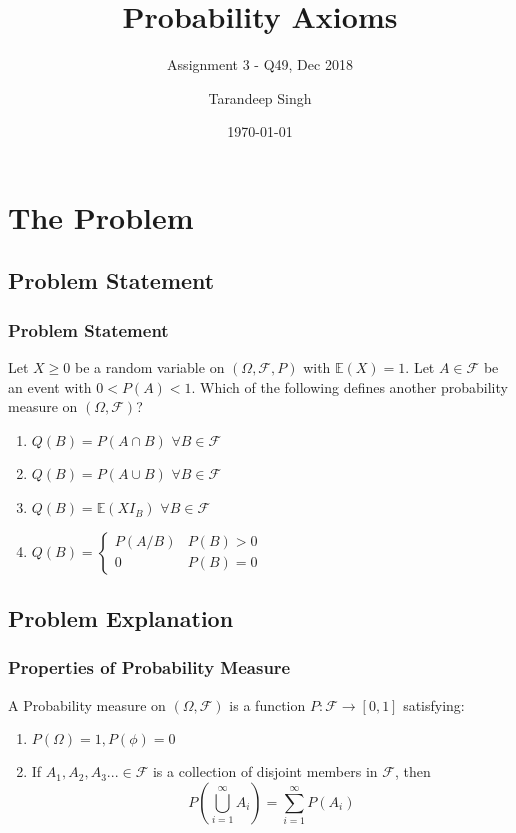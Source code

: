 \documentclass{beamer}
\title{Probability Axioms}
\subtitle{Assignment 3 - Q49, Dec 2018}
\author{Tarandeep Singh}
\institute{IIT Hyderabad}
\date{\today}
\begin{document}
\begin{frame}
\titlepage
\end{frame}
\begin{comment}
\section{Introduction}


\end{comment}
\section{The Problem}
\subsection{Problem Statement}

\begin{frame}
\frametitle{Problem Statement}
Let $X \geq 0$ be a random variable on  $(\Omega,{\mathcal {F}}, P)$ with $\mathbb{E}(X)=1$. Let $A\in{\mathcal {F}}$ be an event with $ 0 < P(A) < 1$. Which of the following defines another probability measure on $(\Omega,{\mathcal {F}})$?
\begin{enumerate}
\item $Q(B) = P(A\cap B)$     $\forall B \in {\mathcal {F}}$
\item $Q(B) = P(A\cup B)$     $\forall B \in {\mathcal {F}}$
\item $Q(B) = \mathbb{E}(XI_{B})$     $\forall B \in {\mathcal {F}}$ 
\item $Q(B) = \begin{cases} 
      P(A/B) & P(B)> 0 \\
      0 & P(B) = 0 
   \end{cases}$

\end{enumerate}
\end{frame}



\subsection{Problem Explanation}
\begin{frame}
\frametitle{Properties of Probability Measure}
A Probability measure on $(\Omega,{\mathcal {F}})$ is a function $P:{\mathcal {F}} \rightarrow [0,1]$ satisfying:
\begin{enumerate}
\item $P(\Omega)=1, P(\phi)=0$
\item If $A_{1},A_{2},A_{3}... \in {\mathcal {F}}$  is a collection of disjoint members in ${\mathcal {F}}$, then  \\
 \[P\left(\bigcup_{i=1}^{\infty} A_{i}\right)= \sum_{i=1}^{\infty} P(A_{i}) \]  
\end{enumerate}
\end{frame}
\end{document}
